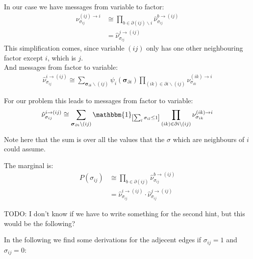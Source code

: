 \documentclass[a4paper]{scrartcl}
\begin{document}
In our case we have messages from variable to factor:
\begin{align}
    \nu_{\sigma_{ij}}^{(ij) \rightarrow i} &\cong \prod_{b \in \partial (ij) \backslash i} \hat{\nu}_{\sigma_{ij}}^{b \rightarrow (ij)} \\
    &= \hat{\nu}_{\sigma_{ij}}^{j \rightarrow (ij)}
\end{align}
This simplification comes, since variable $(ij)$ only has one other neighbouring factor except $i$, which is $j$. \\

And messages from factor to variable:
\begin{align}
    \hat{\nu}_{\sigma_{ij}}^{i \rightarrow (ij)} \cong \sum_{\boldsymbol{\sigma}_{\partial i} \backslash (ij)} 
    \psi_i(\boldsymbol{\sigma}_{\partial i}) \prod_{(ik) \in \partial i \backslash (ij)} \nu_{\sigma_{ik}}^{(ik) \rightarrow i}
\end{align}

For our problem this leads to messages from factor to variable:
\begin{align}
    \hat{\nu}_{\sigma_{ij}}^{i \rightarrow (ij)} &\cong \sum_{\boldsymbol{\sigma}_{\partial i} \backslash (ij)} \mathbbm{1}_{\left[\sum_l \sigma_{il} \leq 1 \right]} \prod_{(ik) \in \partial i \backslash (ij)} \nu_{\sigma_{ik}}^{(ik) \rightarrow i}\\
\end{align}


{
\color{green}
Note here that the sum is over all the values that the $\sigma$ which are neighbours of $i$ could assume.
}


The marginal is:
\begin{align}
    P(\sigma_{ij}) &\cong \prod_{b \in \partial (ij)} \hat{\nu}_{\sigma_{ij}}^{b \rightarrow (ij)} \\
    &= \hat{\nu}_{\sigma_{ij}}^{i \rightarrow (ij)} \cdot \hat{\nu}_{\sigma_{ij}}^{j \rightarrow (ij)}
\end{align}



{
\color{green}
TODO: I don't know if we have to write something for the second hint, but this would be the following?
}

In the following we find some derivations for the adjecent edges if $\sigma_{ij} = 1$ and $\sigma_{ij} = 0$:
\end{document}
